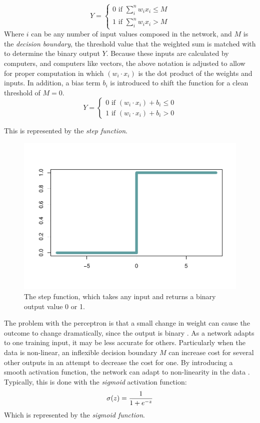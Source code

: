 \[
Y = 
\begin{cases}
0 \text{ if } \sum_i^n w_ix_i \le M \\
1 \text{ if } \sum_i^n w_ix_i > M
\end{cases}
\] Where \(i\) can be any number of input values composed in the
network, and \(M\) is the \textit{decision boundary}, the threshold value that the weighted sum is
matched with to determine the binary output \(Y\).  Because these inputs are calculated by computers, and computers like
vectors, the above notation is adjusted to allow for proper computation in which $(w_i \cdot x_i)$ is the dot product of the weights and inputs. In
addition, a bias term $b_i$ is introduced to shift the function for a clean threshold of \(M = 0\). \[
Y = 
\begin{cases}
0 \text{ if } (w_i \cdot x_i) + b_i \le 0 \\
1 \text{ if } (w_i \cdot x_i) + b_i > 0
\end{cases}
\]

This is represented by the \emph{step function}.

\begin{figure}[H]
    \centering
    \vspace{-40pt}
    \includegraphics[width = .7\textwidth]{Figures/step-function-1.pdf}
    \vspace{-40pt}
    \caption{\footnotesize The step function, which takes any input and returns a binary output value 0 or 1.}
\end{figure}

The problem with the perceptron is that a small change in weight can
cause the outcome to change dramatically, since the output is binary \cite{nielsen}.  As a network adapts to one training input, it may be less accurate for others.  Particularly when the data is non-linear, an inflexible decision boundary $M$ can increase cost for several other outputs in an attempt to decrease the cost for one.  By introducing a smooth activation function, the network can adapt to non-linearity in the data \cite{bishop2006pattern}.
Typically, this is done with the \textit{sigmoid} activation function:
\[
\sigma(z) = \frac{1}{1+e^{-z}} \\
\]
Which is represented by the \emph{sigmoid function}.

